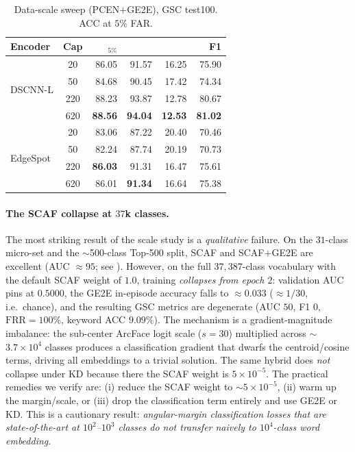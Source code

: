 \documentclass[10pt,twocolumn]{article}
\newcommand{\best}[1]{\textbf{#1}}
\newcommand{\acc}{\text{ACC}}
\newcommand{\frr}{\text{FRR}}
\newcommand{\eer}{\text{EER}}
\newcommand{\auc}{\text{AUC}}
\begin{document}
\begin{table}[t]
\centering
\caption{Data-scale sweep (PCEN$+$GE2E), GSC test100. ACC at $5\%$ FAR.}
\label{tab:scale}
\footnotesize
\setlength{\tabcolsep}{3.5pt}
\begin{tabular}{l c r r r r}
\toprule
\textbf{Encoder} & \textbf{Cap} & \acc$_{5\%}$ & \auc & \eer & F1\\
\midrule
\multirow{4}{*}{DSCNN-L}
 & 20  & 86.05 & 91.57 & 16.25 & 75.90 \\
 & 50  & 84.68 & 90.45 & 17.42 & 74.34 \\
 & 220 & 88.23 & 93.87 & 12.78 & 80.67 \\
 & 620 & \best{88.56} & \best{94.04} & \best{12.53} & \best{81.02} \\
\midrule
\multirow{4}{*}{EdgeSpot}
 & 20  & 83.06 & 87.22 & 20.40 & 70.46 \\
 & 50  & 82.24 & 87.74 & 20.19 & 70.73 \\
 & 220 & \best{86.03} & 91.31 & 16.47 & 75.61 \\
 & 620 & 86.01 & \best{91.34} & 16.64 & 75.38 \\
\bottomrule
\end{tabular}
\end{table}

\paragraph{The SCAF collapse at $37$k classes.}
The most striking result of the scale study is a \emph{qualitative} failure.
On the $31$-class micro-set and the $\sim$500-class Top-500 split, SCAF and
SCAF$+$GE2E are excellent (AUC $\approx95$; see ). However, on the
full $37{,}387$-class vocabulary with the default SCAF weight of $1.0$, training
\emph{collapses from epoch $2$}: validation AUC pins at $0.5000$, the GE2E
in-episode accuracy falls to $\approx0.033$ ($\approx1/30$, i.e.\ chance), and
the resulting GSC metrics are degenerate (AUC $50$, F1 $0$, $\frr{=}100\%$,
keyword ACC $9.09\%$). The mechanism is a gradient-magnitude imbalance: the
sub-center ArcFace logit scale ($s{=}30$) multiplied across $\sim$$3.7\times10^4$
classes produces a classification gradient that dwarfs the centroid/cosine
terms, driving all embeddings to a trivial solution. The same hybrid does
\emph{not} collapse under KD because there the SCAF weight is
$5\times10^{-5}$. The practical remedies we verify are: (i) reduce the SCAF
weight to $\sim$$5\times10^{-5}$, (ii) warm up the margin/scale, or (iii) drop
the classification term entirely and use GE2E or KD. This is a cautionary
result: \emph{angular-margin classification losses that are state-of-the-art at
$10^2$--$10^3$ classes do not transfer naively to $10^4$-class word embedding}.
\end{document}
